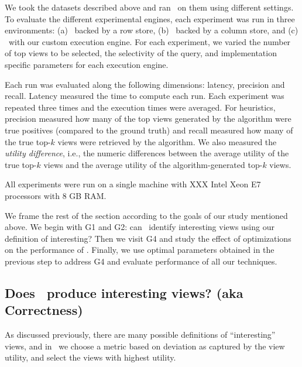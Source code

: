 We took the datasets described above and ran \SeeDB\ on them using different
settings.
To evaluate the different experimental engines, each experiment was run in three
environments: (a) \SeeDB\ backed by a row store, (b) \SeeDB\ backed by a
column store, and (c) \SeeDB\ with our custom execution engine.
For each experiment, we varied the number of top views to be selected, the
selectivity of the query, and implementation specific parameters for each
execution engine.

Each run was evaluated along the following dimensions: latency, precision and
recall. 
Latency measured the time to compute each run. Each experiment was
repeated three times and the execution times were averaged.
For heuristics, precision measured
how many of the top views generated by the algorithm were true positives
(compared to the ground truth) and recall measured how many of the true top-$k$
views were retrieved by the algorithm.
We also measured the {\it utility difference}, i.e., the numeric differences
between the average utility of the true top-$k$ views and the average utility of
the algorithm-generated top-$k$ views.

All experiments were run on a single
machine with XXX Intel Xeon E7 processors with 8 GB
RAM.

We frame the rest of the section according to the goals of our study mentioned
above.
We begin with G1 and G2: can \SeeDB\ identify interesting views using our
definition of interesting? Then we visit G4 and study the effect of
optimizations on the performance of \SeeDB. 
Finally, we use optimal parameters obtained in the previous step to
address G4 and evaluate performance of all our techniques.


\subsection{Does \SeeDB\ produce interesting views? (aka Correctness)}
\label{sec:expt_accuracy}

As discussed previously, there are many possible definitions of ``interesting''
views, and in \SeeDB\ we choose a metric based on deviation as captured by
the view utility, and select the views with highest utility.

